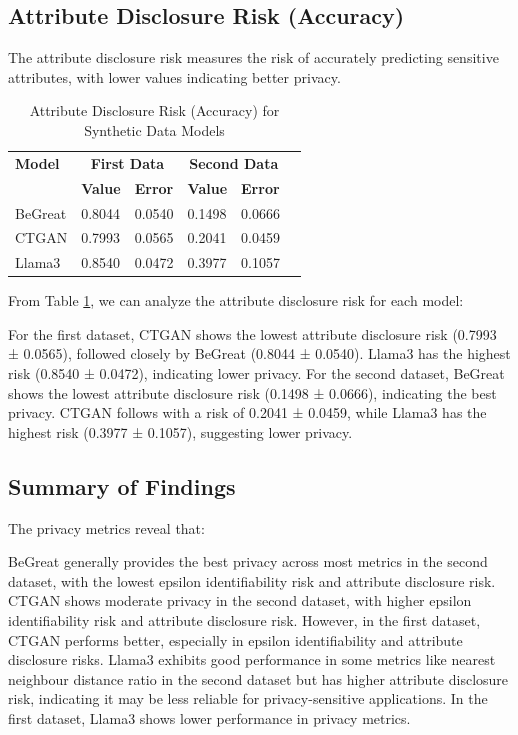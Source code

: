 \subsection{Attribute Disclosure Risk (Accuracy)}

The attribute disclosure risk measures the risk of accurately predicting sensitive attributes, with lower values indicating better privacy.

\begin{table}[H]
\centering
\caption{Attribute Disclosure Risk (Accuracy) for Synthetic Data Models}
\label{tab:attr_disclosure_risk_combined}
\begin{tabularx}{\textwidth}{l*{5}{X}}
    \toprule
    \textbf{Model} & \multicolumn{2}{c}{\textbf{First Data}} & \multicolumn{2}{c}{\textbf{Second Data}} \\
    \cmidrule(lr){2-3} \cmidrule(lr){4-5}
    & \textbf{Value} & \textbf{Error} & \textbf{Value} & \textbf{Error} \\
    \midrule
    BeGreat & 0.8044 & 0.0540 & 0.1498 & 0.0666 \\
    CTGAN & 0.7993 & 0.0565 & 0.2041 & 0.0459 \\
    Llama3 & 0.8540 & 0.0472 & 0.3977 & 0.1057 \\
    \bottomrule
\end{tabularx}
\end{table}


From Table \ref{tab:attr_disclosure_risk_combined}, we can analyze the attribute disclosure risk for each model:

For the first dataset, CTGAN shows the lowest attribute disclosure risk (0.7993 ± 0.0565), followed closely by BeGreat (0.8044 ± 0.0540). Llama3 has the highest risk (0.8540 ± 0.0472), indicating lower privacy.
For the second dataset, BeGreat shows the lowest attribute disclosure risk (0.1498 ± 0.0666), indicating the best privacy. CTGAN follows with a risk of 0.2041 ± 0.0459, while Llama3 has the highest risk (0.3977 ± 0.1057), suggesting lower privacy.



\subsection{Summary of Findings}

The privacy metrics reveal that:

BeGreat generally provides the best privacy across most metrics in the second dataset, with the lowest epsilon identifiability risk and attribute disclosure risk.
CTGAN shows moderate privacy in the second dataset, with higher epsilon identifiability risk and attribute disclosure risk. However, in the first dataset, CTGAN performs better, especially in epsilon identifiability and attribute disclosure risks.
Llama3 exhibits good performance in some metrics like nearest neighbour distance ratio in the second dataset but has higher attribute disclosure risk, indicating it may be less reliable for privacy-sensitive applications. In the first dataset, Llama3 shows lower performance in privacy metrics.


